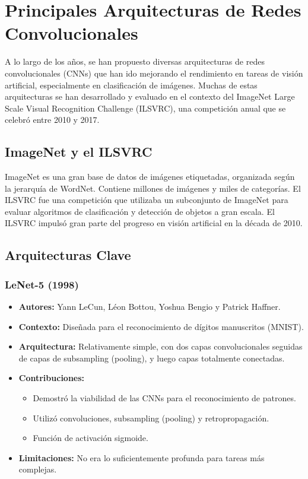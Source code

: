 \documentclass{article}
\begin{document}
\section{Principales Arquitecturas de Redes Convolucionales}

A lo largo de los años, se han propuesto diversas arquitecturas de redes convolucionales (CNNs) que han ido mejorando el rendimiento en tareas de visión artificial, especialmente en clasificación de imágenes. Muchas de estas arquitecturas se han desarrollado y evaluado en el contexto del ImageNet Large Scale Visual Recognition Challenge (ILSVRC), una competición anual que se celebró entre 2010 y 2017.

\subsection{ImageNet y el ILSVRC}

ImageNet es una gran base de datos de imágenes etiquetadas, organizada según la jerarquía de WordNet. Contiene millones de imágenes y miles de categorías. El ILSVRC fue una competición que utilizaba un subconjunto de ImageNet para evaluar algoritmos de clasificación y detección de objetos a gran escala. El ILSVRC impulsó gran parte del progreso en visión artificial en la década de 2010.

\subsection{Arquitecturas Clave}

\subsubsection{LeNet-5 (1998)}

\begin{itemize}
    \item \textbf{Autores:} Yann LeCun, Léon Bottou, Yoshua Bengio y Patrick Haffner.
    \item \textbf{Contexto:}  Diseñada para el reconocimiento de dígitos manuscritos (MNIST).
    \item \textbf{Arquitectura:}  Relativamente simple, con dos capas convolucionales seguidas de capas de subsampling (pooling), y luego capas totalmente conectadas.
    \item \textbf{Contribuciones:}
    \begin{itemize}
        \item Demostró la viabilidad de las CNNs para el reconocimiento de patrones.
        \item Utilizó convoluciones, subsampling (pooling) y retropropagación.
        \item Función de activación sigmoide.
    \end{itemize}
    \item \textbf{Limitaciones:}  No era lo suficientemente profunda para tareas más complejas.
\end{itemize}
\end{document}
